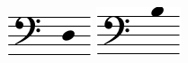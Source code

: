 \includegraphics{02_altura_dis-ad-s-asc-m_difere-1}%
\ifx\betweenLilyPondSystem \undefined
  \linebreak
\else
  \expandafter{}%
\fi
\includegraphics{02_altura_dis-ad-s-asc-m_difere-2}%

